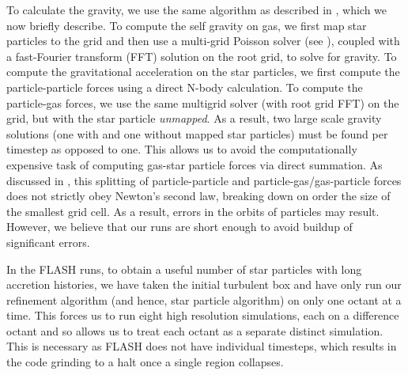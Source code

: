 \documentclass[../dissertation.tex]{subfiles}
\begin{document}
To calculate the gravity, we use the same algorithm as described in 
\citet{2015ApJ...800...49L}, which we now briefly describe. 
To compute the self gravity on gas, we first map star particles 
to the grid and then use a multi-grid Poisson solver 
(see \citealt{2008ApJS..176..293R}), coupled with a fast-Fourier 
transform (FFT) solution on the root grid, to solve for gravity.  
To compute the gravitational acceleration on the star particles, 
we first compute the particle-particle forces using a direct N-body calculation.  
To compute the particle-gas forces, we use the same multigrid solver 
(with root grid FFT) on the grid, but with the star particle {\it unmapped}.   
As a result, two large scale gravity solutions (one with and one without 
mapped star particles) must be found per timestep as opposed to one.
This allows us to avoid the computationally expensive task of computing 
gas-star particle forces via direct summation. As discussed in \citet{2015ApJ...800...49L}, this splitting of particle-particle and particle-gas/gas-particle forces does not strictly obey Newton's second law, breaking down on order the size of the smallest grid cell.  As a result, errors in the orbits of particles may result.   However, we believe that our runs are short enough to avoid buildup of significant errors. 

In the FLASH runs, to obtain a useful number of star particles with long accretion histories, we have 
taken the initial turbulent box and have only run our refinement algorithm 
(and hence, star particle algorithm) on only one octant at a time.  
This forces us to run eight high resolution simulations, each on a 
difference octant and so allows us to treat each octant as a separate 
distinct simulation.  This is necessary as FLASH does not have individual 
timesteps, which results in the code grinding to a halt once a single 
region collapses.
\end{document}

